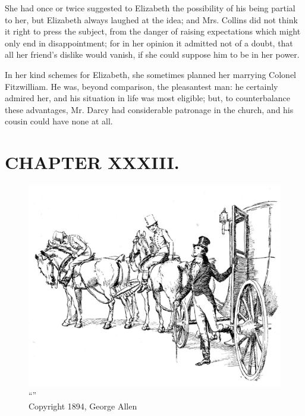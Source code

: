 She had once or twice suggested to Elizabeth the possibility of his being partial to her, but Elizabeth always laughed at the idea; and Mrs. Collins did not think it right to press the subject, from the danger of raising expectations which might only end in disappointment; for in her opinion it admitted not of a doubt, that all her friend's dislike would vanish, if she could suppose him to be in her power.

In her kind schemes for Elizabeth, she sometimes planned her marrying Colonel Fitzwilliam. He was, beyond comparison, the pleasantest man: he certainly admired her, and his situation in life was most eligible; but, to counterbalance these advantages, Mr. Darcy had considerable patronage in the church, and his cousin could have none at all.


\chapter{CHAPTER XXXIII.}

\begin{figure}[htbp]
    \centering
    \includegraphics[width=\textwidth]{illustrations/i_031.jpg}
    \caption{“”\\ Copyright 1894, George Allen}
    \label{fig:image}
\end{figure}


